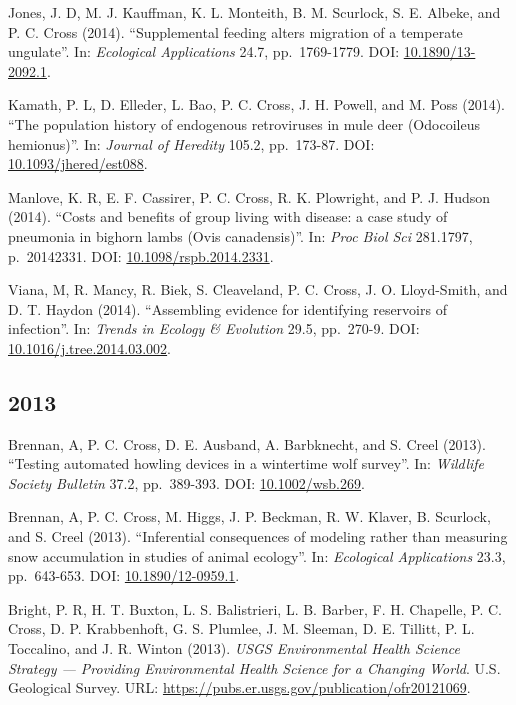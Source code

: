 \documentclass[12pt,]{article}
\begin{document}
Jones, J. D, M. J. Kauffman, K. L. Monteith, B. M. Scurlock, S. E.
Albeke, and P. C. Cross (2014). ``Supplemental feeding alters migration
of a temperate ungulate''. In: \emph{Ecological Applications} 24.7,
pp.~1769-1779. DOI:
\href{https://doi.org/10.1890\%2F13-2092.1}{10.1890/13-2092.1}.

Kamath, P. L, D. Elleder, L. Bao, P. C. Cross, J. H. Powell, and M. Poss
(2014). ``The population history of endogenous retroviruses in mule deer
(Odocoileus hemionus)''. In: \emph{Journal of Heredity} 105.2,
pp.~173-87. DOI:
\href{https://doi.org/10.1093\%2Fjhered\%2Fest088}{10.1093/jhered/est088}.

Manlove, K. R, E. F. Cassirer, P. C. Cross, R. K. Plowright, and P. J.
Hudson (2014). ``Costs and benefits of group living with disease: a case
study of pneumonia in bighorn lambs (Ovis canadensis)''. In: \emph{Proc
Biol Sci} 281.1797, p.~20142331. DOI:
\href{https://doi.org/10.1098\%2Frspb.2014.2331}{10.1098/rspb.2014.2331}.

Viana, M, R. Mancy, R. Biek, S. Cleaveland, P. C. Cross, J. O.
Lloyd-Smith, and D. T. Haydon (2014). ``Assembling evidence for
identifying reservoirs of infection''. In: \emph{Trends in Ecology \&
Evolution} 29.5, pp.~270-9. DOI:
\href{https://doi.org/10.1016\%2Fj.tree.2014.03.002}{10.1016/j.tree.2014.03.002}.

\hypertarget{section-6}{%
\subsection{2013}\label{section-6}}

Brennan, A, P. C. Cross, D. E. Ausband, A. Barbknecht, and S. Creel
(2013). ``Testing automated howling devices in a wintertime wolf
survey''. In: \emph{Wildlife Society Bulletin} 37.2, pp.~389-393. DOI:
\href{https://doi.org/10.1002\%2Fwsb.269}{10.1002/wsb.269}.

Brennan, A, P. C. Cross, M. Higgs, J. P. Beckman, R. W. Klaver, B.
Scurlock, and S. Creel (2013). ``Inferential consequences of modeling
rather than measuring snow accumulation in studies of animal ecology''.
In: \emph{Ecological Applications} 23.3, pp.~643-653. DOI:
\href{https://doi.org/10.1890\%2F12-0959.1}{10.1890/12-0959.1}.

Bright, P. R, H. T. Buxton, L. S. Balistrieri, L. B. Barber, F. H.
Chapelle, P. C. Cross, D. P. Krabbenhoft, G. S. Plumlee, J. M. Sleeman,
D. E. Tillitt, P. L. Toccalino, and J. R. Winton (2013). \emph{USGS
Environmental Health Science Strategy --- Providing Environmental Health
Science for a Changing World}. U.S. Geological Survey. URL:
\url{https://pubs.er.usgs.gov/publication/ofr20121069}.
\end{document}
